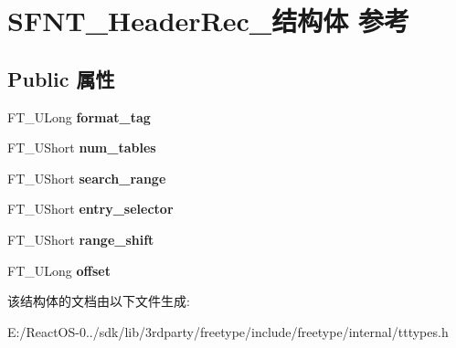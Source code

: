 \hypertarget{struct_s_f_n_t___header_rec__}{}\section{S\+F\+N\+T\+\_\+\+Header\+Rec\+\_\+结构体 参考}
\label{struct_s_f_n_t___header_rec__}
\subsection*{Public 属性}
\begin{DoxyCompactItemize}
\item 
\mbox{\label{struct_s_f_n_t___header_rec___ad59d649b189ab19fae02341e95e02448}} 
F\+T\+\_\+\+U\+Long {\bfseries format\+\_\+tag}
\item 
\mbox{\label{struct_s_f_n_t___header_rec___a46d8d8bf8f2d8b6536eb5fa5704852e2}} 
F\+T\+\_\+\+U\+Short {\bfseries num\+\_\+tables}
\item 
\mbox{\label{struct_s_f_n_t___header_rec___a39ca0e21eaec6be602547bb2ed898d5d}} 
F\+T\+\_\+\+U\+Short {\bfseries search\+\_\+range}
\item 
\mbox{\label{struct_s_f_n_t___header_rec___ada628a85486eb034abd56b872ecdcd78}} 
F\+T\+\_\+\+U\+Short {\bfseries entry\+\_\+selector}
\item 
\mbox{\label{struct_s_f_n_t___header_rec___aa2a39db194a8a9a0cc8504143ac4f5c1}} 
F\+T\+\_\+\+U\+Short {\bfseries range\+\_\+shift}
\item 
\mbox{\label{struct_s_f_n_t___header_rec___a04f99ce2ff335f8702a4edf7132a3e04}} 
F\+T\+\_\+\+U\+Long {\bfseries offset}
\end{DoxyCompactItemize}


该结构体的文档由以下文件生成\+:\begin{DoxyCompactItemize}
\item 
E\+:/\+React\+O\+S-\/0../sdk/lib/3rdparty/freetype/include/freetype/internal/tttypes.\+h\end{DoxyCompactItemize}
